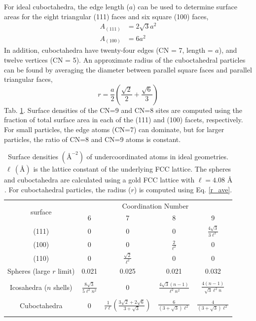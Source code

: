 \documentclass[journal = jpccck, manuscript = suppinfo]{achemso}
\begin{document}
For ideal cuboctahedra, the edge length ($a$) can be used to determine
surface areas for the eight triangular (111) faces and six square
(100) faces,
\begin{align}
A_\mathrm{(111)} &= 2 \sqrt{3} a^2 \\
A_\mathrm{(100)} &= 6 a^2 
\end{align}
In addition, cuboctahedra have twenty-four edges (CN = 7, length =
$a$), and twelve vertices (CN = 5).  An approximate radius of the
cuboctahedral particles can be found by averaging the diameter between
parallel square faces and parallel triangular faces,
\begin{equation}
r  = \frac{a}{2} \left(\frac{\sqrt{2}}{2} + \frac{\sqrt{6}}{3}\right) 
\label{r_ave}
\end{equation} 
Tab. \ref{tab:undercoord}.  Surface densities of the CN=9 and CN=8
sites are computed using the fraction of total surface area in each of
the (111) and (100) facets, respectively.  For small particles, the
edge atoms (CN=7) can dominate, but for larger particles, the ratio of
CN=8 and CN=9 atoms is constant.  
\begin{table}
\centering
\caption{Surface densities $(\text{\AA}^{-2})$ of undercoordinated
  atoms in ideal geometries. $\ell~(\text{\AA})$ is the
  lattice constant of the underlying FCC lattice.  The spheres and
  cuboctahedra are calculated using a gold FCC lattice with $\ell = 4.08
  \text{~\AA}$.  For cuboctahedral particles, the radius ($r$) is computed
  using Eq. \eqref{r_ave}.
  \label{tab:undercoord}}
\begin{tabular}{ c|cccc }
\toprule
\multirow{2}{*}{surface} & \multicolumn{4}{c}{Coordination Number}\\
        & 6 & 7 & 8 & 9 \\
 \midrule
(111)      & 0 & 0     & 0     & $\frac{4 \sqrt{3}}{3 \ell^2}$ \\
(100)      & 0 & 0     & $\frac{2}{\ell^2}$ & 0     \\
(110)      & 0 & $\frac{\sqrt{2}}{\ell^2}$ & 0     & 0     \\  
 \midrule
Spheres (large $r$ limit)    & 0.021 & 0.025 & 0.021 & 0.032\\ \\
Icosahedra ($n$ shells)  & $\frac{8\sqrt{3}}{5\ell^2n^2}$  &  0 &
 $\frac{4\sqrt{3}(n-1)}{\ell^2n^2}$ &
 $\frac{4(n - 1)}{\sqrt{3}\ell^2 n}$ \\ \\
Cuboctahedra & 0 & $\frac{1}{r\ell} \left(\frac{3\sqrt{2} + 2\sqrt{6}}{3+\sqrt{3}}\right)$ & $\frac{6}{(3+\sqrt{3})\ell^2}$ & $\frac{4}{(3+\sqrt{3})\ell^2}$\\ \\
\bottomrule
\end{tabular}
\end{table}
\end{document}
